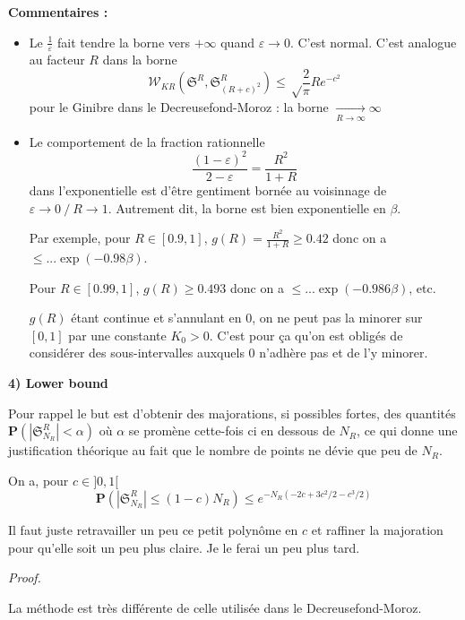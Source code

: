 \documentclass[11pt]{article}
\begin{document}
\textbf{Commentaires :}

\begin{itemize}

  \item Le $ \frac 1 \varepsilon $ fait tendre la borne vers $+\infty $ quand $ \varepsilon \to 0 $. C'est normal. C'est analogue au facteur $ R $ dans la borne $$ \mathcal W_{KR}(\mathfrak S^R, \mathfrak S^R_{(R+c)^2} ) \leqslant \sqrt \frac{2}{\pi} R e^{-c^2  }$$ pour le Ginibre dans le Decreusefond-Moroz : la borne $\xrightarrow[R \to \infty]{} \infty $

  \newpage

  \item Le comportement de la fraction rationnelle $$\frac{(1-\varepsilon)^2}{ 2-\varepsilon } = \frac{R^2}{1+R} $$ dans l'exponentielle est d'être gentiment bornée au voisinnage de $ \varepsilon \to 0 \: / \: R \to 1 $. Autrement dit, la borne est bien exponentielle en $ \beta $.

  Par exemple, pour $ R \in [0.9,1] $, $g(R) = \frac{R^2}{1+R} \geqslant 0.42 $ donc on a $ \leqslant ... \exp \left( - 0.98 \beta \right) $. 

  Pour $ R \in [0.99,1] $, $g(R) \geqslant 0.493 $ donc on a $ \leqslant ... \exp \left( - 0.986 \beta \right) $, etc. 
  
  $g(R)$ étant continue et s'annulant en 0, on ne peut pas la minorer sur $[0,1]$ par une constante $ K_0 > 0 $. C'est pour ça qu'on est \og obligés \fg \: de considérer des sous-intervalles auxquels 0 n'adhère pas et de l'y minorer.
  
\end{itemize}

\textbf{4) Lower bound}

Pour rappel le but est d'obtenir des majorations, si possibles fortes, des quantités $ \mathbf P(| \mathfrak S^R_{N_R} | < \alpha ) $ où $ \alpha $ se promène cette-fois ci en dessous de $N_R$, ce qui donne une justification théorique au fait que le nombre de points ne dévie que peu de $ N_R $. 

On a, pour $c \in ]0,1[ $ $$ \mathbf P( | \mathfrak S_{N_R}^R | \leqslant (1-c) N_R ) \leqslant e^{-N_R(-2c + 3c^2/2 - c^3/2)} $$

Il faut juste retravailler un peu ce petit polynôme en $c$ et raffiner la majoration pour qu'elle soit un peu plus claire. Je le ferai un peu plus tard.

\textit{Proof.} 

La méthode est très différente de celle utilisée dans le Decreusefond-Moroz.
\end{document}
